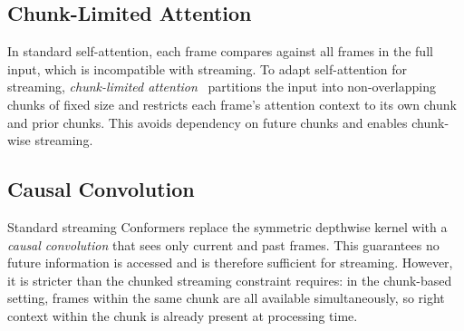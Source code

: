 \documentclass[cameraready]{Interspeech}
\begin{document}

\subsection{Chunk-Limited Attention}
\label{subsec:chunk-attention}

In standard self-attention, each frame compares against all frames in the full
input, which is incompatible with streaming. To adapt self-attention for
streaming,
\emph{chunk-limited attention}~\cite{chen2021developing,noroozi2024stateful} partitions
the input into non-overlapping chunks of fixed size and restricts each frame's
attention context to its own chunk and prior chunks. This avoids dependency on
future chunks and enables chunk-wise streaming.

 

\subsection{Causal Convolution}
\label{subsec:causal-conv}

Standard streaming Conformers replace the symmetric depthwise kernel with a
\emph{causal convolution} that sees only current and past frames.
This
guarantees no future information is accessed and is therefore sufficient for
streaming. However, it is stricter than the chunked streaming constraint requires: in
the chunk-based setting, frames within the same chunk are all available
simultaneously, so right context within the chunk is already present at
processing time.

\end{document}
